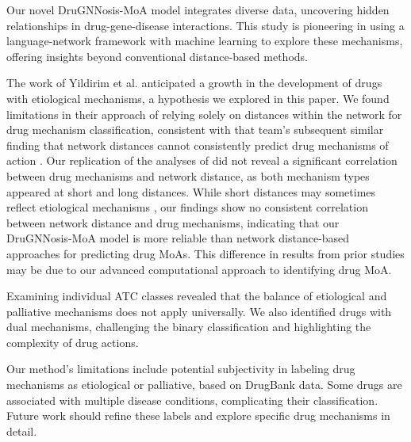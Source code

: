 \documentclass[journal,twoside,web]{ieeecolor}
\begin{document}
Our novel DruGNNosis-MoA model integrates diverse data, uncovering hidden relationships in drug-gene-disease interactions. 
This study is pioneering in using a language-network framework with machine learning to explore these mechanisms, offering insights beyond conventional distance-based methods.

The work of Yildirim et al. \cite{yildirim2007drug} anticipated a growth in the development of drugs with etiological mechanisms, a hypothesis we explored in this paper.
We found limitations in their approach \cite{yildirim2007drug} of relying solely on distances within the network for drug mechanism classification, consistent with that team's subsequent similar finding that network distances cannot consistently predict drug mechanisms of action \cite{guney2016network}.
Our replication of the analyses of \cite{yildirim2007drug} did not reveal a significant correlation between drug mechanisms and network distance, as both mechanism types appeared at short and long distances. 
While short distances may sometimes reflect etiological mechanisms \cite{yildirim2007drug}, our findings show no consistent correlation between network distance and drug mechanisms, indicating that our DruGNNosis-MoA model is more reliable than network distance-based approaches for predicting drug MoAs.
This difference in results from prior studies may be due to our advanced computational approach to identifying drug MoA.

Examining individual ATC classes revealed that the balance of etiological and palliative mechanisms does not apply universally.
We also identified drugs with dual mechanisms, challenging the binary classification and highlighting the complexity of drug actions.

Our method's limitations include potential subjectivity in labeling drug mechanisms as etiological or palliative, based on DrugBank data.
Some drugs are associated with multiple disease conditions, complicating their classification. 
Future work should refine these labels and explore specific drug mechanisms in detail.
\end{document}
